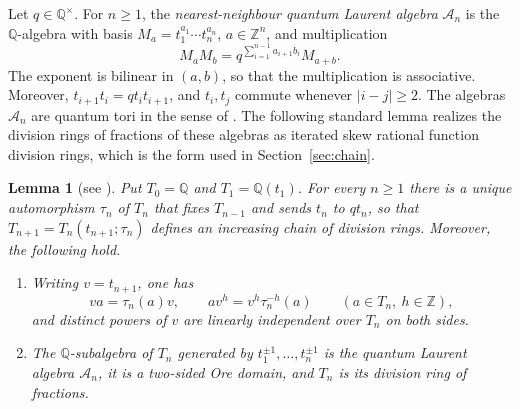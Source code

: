 \documentclass[11pt,a4paper]{amsart}
\newtheorem{lemma}[theorem]{Lemma}
\numberwithin{equation}{section}
\newcommand{\Q}{\mathbb{Q}}
\begin{document}
Let $q\in\Q^\times$. For $n\ge1$, the \emph{nearest-neighbour quantum Laurent algebra} $\mathcal A_n$ is the $\Q$-algebra with basis $M_a=t_1^{a_1}\cdots t_n^{a_n}$, $a\in\mathbb Z^n$, and multiplication
\begin{equation}\label{eq:qtorus}
M_aM_b=q^{\sum_{i=1}^{n-1}a_{i+1}b_i}M_{a+b}.
\end{equation}
The exponent is bilinear in $(a,b)$, so that the multiplication is associative. Moreover, $t_{i+1}t_i=qt_it_{i+1}$, and $t_i,t_j$ commute whenever $|i-j|\ge2$. The algebras $\mathcal A_n$ are quantum tori in the sense of \cite{BG,GW}. The following standard lemma realizes the division rings of fractions of these algebras as iterated skew rational function division rings, which is the form used in Section~\ref{sec:chain}.

\begin{lemma}[{see \cite{BG,GW}}]\label{lem:qtorus}
Put $T_0=\Q$ and $T_1=\Q(t_1)$. For every $n\ge1$ there is a unique automorphism $\tau_n$ of $T_n$ that fixes $T_{n-1}$ and sends $t_n$ to $qt_n$, so that $T_{n+1}=T_n(t_{n+1};\tau_n)$ defines an increasing chain of division rings. Moreover, the following hold.
\begin{enumerate}
\item[(1)] Writing $v=t_{n+1}$, one has
\begin{equation}\label{eq:skew}
va=\tau_n(a)v,\qquad av^h=v^h\tau_n^{-h}(a)\qquad(a\in T_n,\ h\in\mathbb Z),
\end{equation}
and distinct powers of $v$ are linearly independent over $T_n$ on both sides.
\item[(2)] The $\Q$-subalgebra of $T_n$ generated by $t_1^{\pm1},\dots,t_n^{\pm1}$ is the quantum Laurent algebra $\mathcal A_n$, it is a two-sided Ore domain, and $T_n$ is its division ring of fractions.
\end{enumerate}
\end{lemma}
\end{document}
